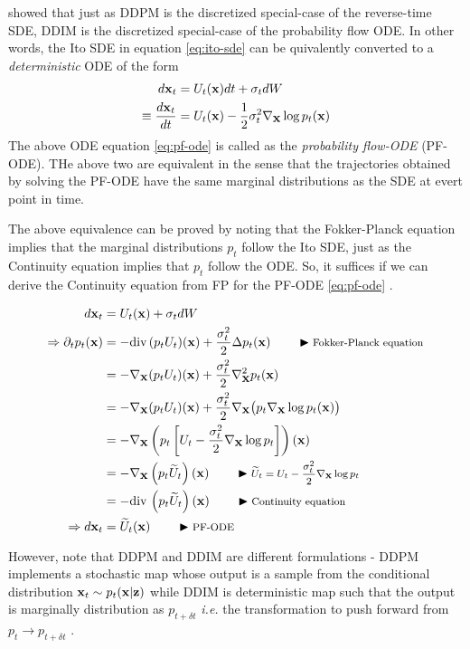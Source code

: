 \documentclass[a4paper, 11pt]{article}
\begin{document}
\cite{song2020score} showed that just as DDPM is the discretized special-case of the reverse-time SDE, DDIM is the discretized special-case of the probability flow ODE. In other words, the Ito SDE in equation \eqref{eq:ito-sde} can be quivalently converted to a \emph{deterministic} ODE of the form 
\begin{align}
    d\mbox{$\mbox{$\mathbf{x}$}$}_t &= U_t(\mbox{$\mbox{$\mathbf{x}$}$})dt + \sigma_t dW \\
    \equiv \frac{d\mbox{$\mbox{$\mathbf{x}$}$}_t}{dt} &= U_t(\mbox{$\mbox{$\mathbf{x}$}$}) - \frac{1}{2} \sigma_t^2 \nabla_{\mbox{$\mbox{$\mathbf{x}$}$}} \log p_t(\mbox{$\mbox{$\mathbf{x}$}$}) \label{eq:pf-ode}
\end{align}
The above ODE equation \eqref{eq:pf-ode} is called as the \emph{probability flow-ODE} (PF-ODE). THe above two are equivalent in the sense that the trajectories obtained by solving the PF-ODE have the same marginal distributions as the SDE at evert point in time.

The above equivalence can be proved by noting that the Fokker-Planck equation implies that the marginal distributions $p_t$ follow the Ito SDE, just as the Continuity equation implies that $p_t$ follow the ODE. So, it suffices if we can derive the Continuity equation from FP for the PF-ODE \eqref{eq:pf-ode} \citep{nakkiran2024step}.

\begin{align}
    d\mbox{$\mbox{$\mathbf{x}$}$}_t &= U_t(\mbox{$\mbox{$\mathbf{x}$}$}) + \sigma_t dW \\
    \Rightarrow \partial_t p_t(\mbox{$\mbox{$\mathbf{x}$}$}) &= -\text{div}\, (p_t U_t)(\mbox{$\mbox{$\mathbf{x}$}$}) + \frac{\sigma_t^2}{2} \Delta p_t(\mbox{$\mbox{$\mathbf{x}$}$}) \qquad \blacktriangleright\text{\footnotesize Fokker-Planck equation}\\
    &= -\nabla_{\mbox{$\mbox{$\mathbf{x}$}$}} (p_t U_t)(\mbox{$\mbox{$\mathbf{x}$}$}) + \frac{\sigma_t^2}{2} \nabla_{\mbox{$\mbox{$\mathbf{x}$}$}}^2 p_t(\mbox{$\mbox{$\mathbf{x}$}$}) \\ 
    &= -\nabla_{\mbox{$\mbox{$\mathbf{x}$}$}} (p_t U_t)(\mbox{$\mbox{$\mathbf{x}$}$}) + \frac{\sigma_t^2}{2} \nabla_{\mbox{$\mbox{$\mathbf{x}$}$}} \big (p_t \nabla_{\mbox{$\mbox{$\mathbf{x}$}$}} \log p_t(\mbox{$\mbox{$\mathbf{x}$}$}) \big ) \\ 
    &= -\nabla_{\mbox{$\mbox{$\mathbf{x}$}$}} \left ( p_t \left [ U_t - \frac{\sigma_t^2}{2}\nabla_{\mbox{$\mbox{$\mathbf{x}$}$}} \log p_t \right ] \right ) (\mbox{$\mbox{$\mathbf{x}$}$}) \\ 
    &= -\nabla_{\mbox{$\mbox{$\mathbf{x}$}$}} \left ( p_t \widetilde{U}_t\right ) (\mbox{$\mbox{$\mathbf{x}$}$}) \qquad \blacktriangleright\text{\footnotesize $\widetilde{U}_t = U_t - \frac{\sigma_t^2}{2}\nabla_{\mbox{$\mbox{$\mathbf{x}$}$}} \log p_t$} \\ 
    &= -\text{div}\, \left ( p_t \widetilde{U}_t\right ) (\mbox{$\mbox{$\mathbf{x}$}$}) \qquad \blacktriangleright\text{\footnotesize Continuity equation}\\
    \Rightarrow d\mbox{$\mbox{$\mathbf{x}$}$}_t &= \widetilde{U}_t(\mbox{$\mbox{$\mathbf{x}$}$}) \qquad \blacktriangleright\text{\footnotesize PF-ODE}
\end{align}


However, note that DDPM and DDIM are different formulations - DDPM implements a stochastic map  whose output is a sample from the conditional distribution $\mbox{$\mbox{$\mathbf{x}$}$}_t \sim p_t(\mbox{$\mbox{$\mathbf{x}$}$} | \mbox{$\mbox{$\mathbf{z}$}$})$ while DDIM is deterministic map such that the output is marginally distribution as $p_{t + \delta t}$ \textit{i.e.} the transformation to push forward from $p_t \to p_{t + \delta t}$ \citep{nakkiran2024step}.
\end{document}
